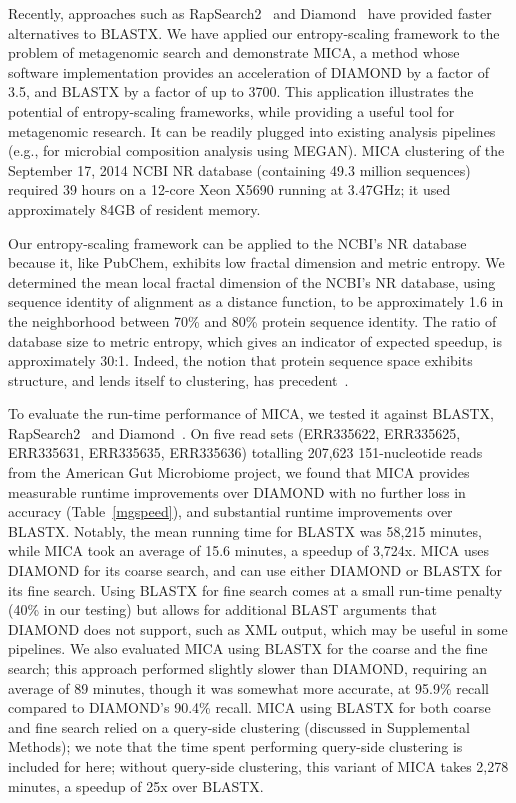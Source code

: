 \documentclass[review,preprint,12pt]{elsarticle}
\renewcommand{\cite}{\citep} %
\theoremstyle{definition}
\theoremstyle{remark}
\numberwithin{equation}{section}
\begin{document}
Recently, approaches such as RapSearch2~\cite{zhao2012rapsearch2} and 
Diamond~\cite{buchfink2014fast} have provided faster alternatives to BLASTX.
We have applied our entropy-scaling framework to the problem of 
metagenomic search and demonstrate MICA, a method whose software 
implementation provides an acceleration of DIAMOND by a factor of 3.5, and 
BLASTX by a factor of up to 3700.
This application illustrates the potential of entropy-scaling frameworks, while
providing a useful tool for metagenomic research.
It can be readily plugged into existing analysis pipelines (e.g., for microbial 
composition analysis using MEGAN).
MICA clustering of the September 17, 2014 NCBI NR database (containing 49.3 million sequences) required 39 
hours on a 12-core Xeon X5690 running at 3.47GHz; it used approximately 84GB of resident memory.

Our entropy-scaling framework can be applied to the NCBI's NR database because it, 
like PubChem, exhibits low fractal dimension and metric entropy.
We determined the mean local fractal dimension of the NCBI's NR database, using 
sequence identity of alignment as a distance function, to be approximately 1.6 
in the neighborhood between 70\% and 80\% protein sequence identity.
The ratio of database size to metric entropy, which gives an indicator of expected speedup,
is approximately 30:1.
Indeed, the notion that protein sequence space exhibits structure, 
and lends itself to clustering, has precedent~\cite{linial1997global}.

To evaluate the run-time performance of MICA, we tested it against
BLASTX, RapSearch2~\cite{zhao2012rapsearch2} and 
Diamond~\cite{buchfink2014fast}.
On five read sets (ERR335622, ERR335625, ERR335631, ERR335635, ERR335636) totalling 207,623 151-nucleotide reads from 
the American Gut Microbiome project, we found that MICA provides 
measurable runtime improvements over DIAMOND with no further loss in accuracy 
(Table~\ref{mgspeed}), and substantial runtime improvements over BLASTX.
Notably, the mean running time for BLASTX was 58,215 minutes, 
while MICA took an average of 15.6 minutes, a speedup of 3,724x.
MICA uses DIAMOND for its coarse search, and can use either DIAMOND or BLASTX
for its fine search.
Using BLASTX for fine search comes at a small run-time penalty (40\% in our 
testing) but allows for additional BLAST arguments that DIAMOND does not
support, such as XML output, which may be useful in some pipelines.
We also evaluated MICA using BLASTX for the coarse and the fine search; this
approach performed slightly slower than DIAMOND, requiring an average of 89 minutes, though it was somewhat more accurate, at 95.9\% recall compared to
DIAMOND's 90.4\% recall.
MICA using BLASTX for both coarse and fine search relied on a query-side
clustering (discussed in Supplemental Methods); we note that the time spent 
performing query-side clustering is included for here; without query-side clustering, this variant of MICA takes 2,278 minutes, a speedup of 25x over
BLASTX.
\end{document}
